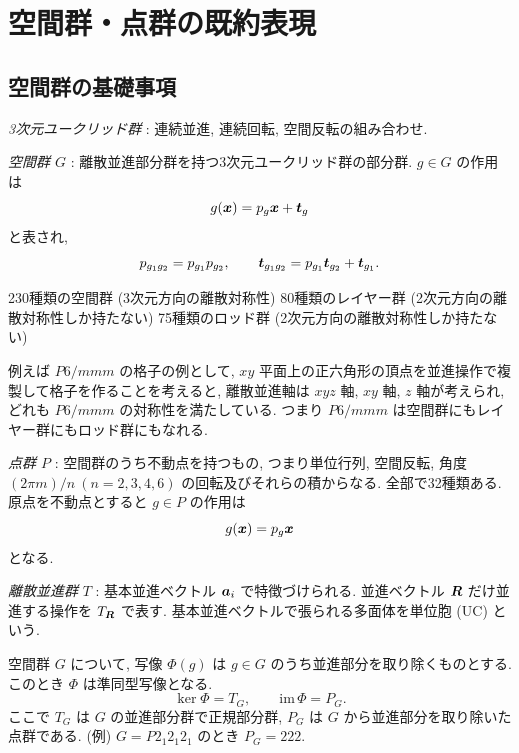 \section{空間群・点群の既約表現}
\subsection{空間群の基礎事項}

\emph{3次元ユークリッド群} : 連続並進, 連続回転, 空間反転の組み合わせ.

\emph{空間群 $G$} : 離散並進部分群を持つ3次元ユークリッド群の部分群.
$g \in G$ の作用は
\begin{equation}
 g(\bm{x}) = p_g \bm{x} + \bm{t}_g
\end{equation}
と表され,
\begin{equation}
 p_{g_1 g_2} = p_{g_1} p_{g_2}, \qquad
 \bm{t}_{g_1 g_2} = p_{g_1} \bm{t}_{g_2} + \bm{t}_{g_1}.
\end{equation}

230種類の空間群 (3次元方向の離散対称性)
80種類のレイヤー群 (2次元方向の離散対称性しか持たない)
75種類のロッド群 (2次元方向の離散対称性しか持たない)

例えば $P6/mmm$ の格子の例として, $xy$ 平面上の正六角形の頂点を並進操作で複製して格子を作ることを考えると, 離散並進軸は $xyz$ 軸, $xy$ 軸, $z$ 軸が考えられ, どれも $P6/mmm$ の対称性を満たしている. つまり $P6/mmm$ は空間群にもレイヤー群にもロッド群にもなれる.

\emph{点群 $P$} : 空間群のうち不動点を持つもの, つまり単位行列, 空間反転, 角度 $(2\pi m)/n\ (n = 2,3,4,6)$ の回転及びそれらの積からなる. 全部で32種類ある. 原点を不動点とすると $g \in P$ の作用は
\begin{equation}
 g(\bm{x}) = p_g \bm{x}
\end{equation}
となる.

\emph{離散並進群} $T$ : 基本並進ベクトル $\bm{a}_i$ で特徴づけられる. 並進ベクトル $\bm{R}$ だけ並進する操作を $T_{\bm{R}}$ で表す. 基本並進ベクトルで張られる多面体を単位胞 (UC) という.

空間群 $G$ について, 写像 $\Phi(g)$ は $g \in G$ のうち並進部分を取り除くものとする. このとき $\Phi$ は準同型写像となる.
\begin{equation}
 \ker \Phi = T_G, \qquad \mathrm{im}\,\Phi = P_G.
\end{equation}
ここで $T_G$ は $G$ の並進部分群で正規部分群, $P_G$ は $G$ から並進部分を取り除いた点群である. (例) $G = P2_1 2_1 2_1$ のとき $P_G = 222$.

